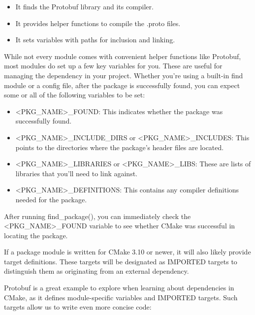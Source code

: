\begin{itemize}
\item
It finds the Protobuf library and its compiler.

\item
It provides helper functions to compile the .proto files.

\item
It sets variables with paths for inclusion and linking.
\end{itemize}

While not every module comes with convenient helper functions like Protobuf, most modules do set up a few key variables for you. These are useful for managing the dependency in your project. Whether you’re using a built-in find module or a config file, after the package is successfully found, you can expect some or all of the following variables to be set:

\begin{itemize}
\item
<PKG\_NAME>\_FOUND: This indicates whether the package was successfully found.

\item
<PKG\_NAME>\_INCLUDE\_DIRS or <PKG\_NAME>\_INCLUDES: This points to the directories where the package’s header files are located.

\item
<PKG\_NAME>\_LIBRARIES or <PKG\_NAME>\_LIBS: These are lists of libraries that you’ll need to link against.

\item
<PKG\_NAME>\_DEFINITIONS: This contains any compiler definitions needed for the package.
\end{itemize}

After running find\_package(), you can immediately check the <PKG\_NAME>\_FOUND variable to see whether CMake was successful in locating the package.

If a package module is written for CMake 3.10 or newer, it will also likely provide target definitions. These targets will be designated as IMPORTED targets to distinguish them as originating from an external dependency.

Protobuf is a great example to explore when learning about dependencies in CMake, as it defines module-specific variables and IMPORTED targets. Such targets allow us to write even more concise code:



